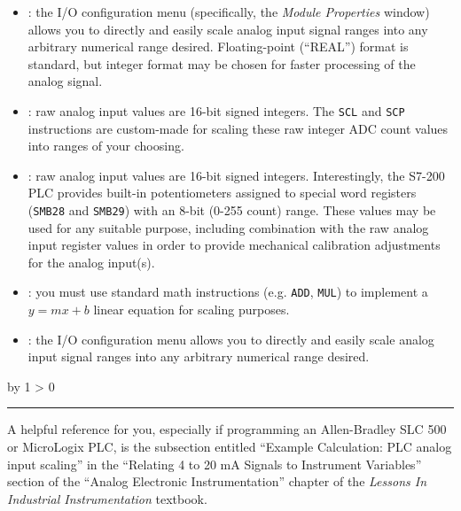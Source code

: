 \documentclass[12pt,a4paper]{article}
\def\svar{
           \advance\answnum by 1
           \ifnum \answnum > 0
                \hrule
                \vskip 3pt
                \leftline{Svar \the\answnum}
                \vskip 3pt \fi}
\begin{document}
\begin{itemize}
\item{} : the I/O configuration menu (specifically, the {\it Module Properties} window) allows you to directly and easily scale analog input signal ranges into any arbitrary numerical range desired.  Floating-point (``REAL'') format is standard, but integer format may be chosen for faster processing of the analog signal.
\vskip 5pt
\item{} : raw analog input values are 16-bit signed integers.  The {\tt SCL} and {\tt SCP} instructions are custom-made for scaling these raw integer ADC count values into ranges of your choosing.
\vskip 5pt
\item{} : raw analog input values are 16-bit signed integers.  Interestingly, the S7-200 PLC provides built-in potentiometers assigned to special word registers ({\tt SMB28} and {\tt SMB29}) with an 8-bit (0-255 count) range.  These values may be used for any suitable purpose, including combination with the raw analog input register values in order to provide mechanical calibration adjustments for the analog input(s).
\vskip 5pt
\item{} : you must use standard math instructions (e.g. {\tt ADD}, {\tt MUL}) to implement a $y = mx + b$ linear equation for scaling purposes.
\vskip 5pt
\item{} : the I/O configuration menu allows you to directly and easily scale analog input signal ranges into any arbitrary numerical range desired.
\end{itemize}

\eject
\vskip 10pt \filbreak 





\svar{} 

A helpful reference for you, especially if programming an Allen-Bradley SLC 500 or MicroLogix PLC, is the subsection entitled ``Example Calculation: PLC analog input scaling'' in the ``Relating 4 to 20 mA Signals to Instrument Variables'' section of the ``Analog Electronic Instrumentation'' chapter of the {\it Lessons In Industrial Instrumentation} textbook.

\vskip 10pt \filbreak 
\end{document}
